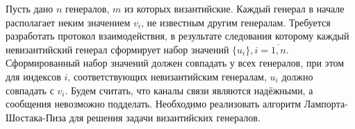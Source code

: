 Пусть дано $n$ генералов, $m$ из которых византийские. Каждый генерал в начале располагает неким значением $v_i$, не известным другим генералам. Требуется разработать протокол взаимодействия, в результате следования которому каждый невизантийский генерал сформирует набор значений $\{u_i\}, i = \overline{1,n}$. Сформированный набор значений должен совпадать у всех генералов, при этом для индексов $i$, соответствующих невизантийским генералам, $u_i$ должно совпадать с $v_i$.
Будем считать, что каналы связи являются надёжными, а сообщения невозможно подделать.
Необходимо реализовать алгоритм Лампорта-Шостака-Пиза для решения задачи византийских генералов.